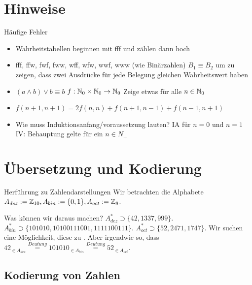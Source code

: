 \documentclass[handout]{beamer}
\begin{document}

\begin{frame}
	\titlepage
\end{frame}

\section{Hinweise}

\begin{frame} {Häufige Fehler}
	\begin{itemize}
		\item Wahrheitstabellen beginnen mit fff und \grqq zählen\grqq{}  dann hoch 
		\item fff, ffw, fwf, fww, wff, wfw, wwf, www (wie Binärzahlen)
		\pitem $B_1 \equiv B_2$ um zu zeigen, dass zwei Ausdrücke für jede Belegung gleichen Wahrheitswert haben
		\item $(a \land b) \lor b \equiv b$
		\pitem $f:\mathbb{N}_0 \times \mathbb{N}_0\rightarrow \mathbb{N}_0$ Zeige etwas für alle $n \in \mathbb{N}_0$
		\item $f(n+1, n+1) =  2f(n, n) + f(n + 1, n - 1) + f(n - 1, n + 1)$
		\item Wie muss Induktionsanfang/voraussetzung lauten?
		\pitem IA für $n = 0$ und $n = 1$
		\pitem IV: Behauptung gelte für ein $n \in N_+$
	\end{itemize}
\end{frame}


\section{Übersetzung und Kodierung}

\begin{frame}{Herführung zu Zahlendarstellungen}
	\pause Wir betrachten die Alphabete $A_{dez} := \mathbb{Z}_{10}, A_{bin} := \{0, 1\}, A_{oct} := \mathbb{Z}_8$.
	\begin{itemize}
		\pitem Was können wir daraus machen?
		\pitem $A_{dez}^* \supset \{42, 1337, 999\}$.
		\pitem $A_{bin}^* \supset \{101010, 10100111001, 1111100111\}$.
		\pitem $A_{oct}^* \supset \{52, 2471, 1747\}$.
		\pitem Wir suchen eine Möglichkeit, diese  zu .
		\pitem Aber irgendwie so, dass $42_{\in A_{dez}} \stackrel{Deutung}{=} 101010_{\in A_{bin}} \stackrel{Deutung}{=} 52_{\in A_{oct}}$.
	\end{itemize}
\end{frame}

\subsection{Kodierung von Zahlen}
\end{document}
